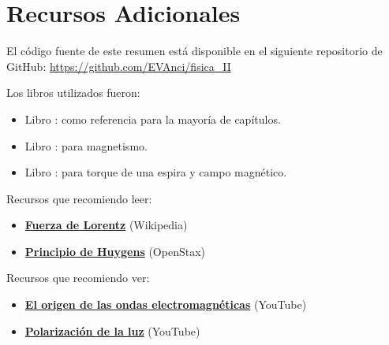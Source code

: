 \documentclass[a4paper,12pt]{article}  %
\begin{document}
  \section*{Recursos Adicionales}
  \noindent El código fuente de este resumen está disponible en el siguiente repositorio de GitHub: \url{https://github.com/EVAnci/fisica_II}
  \vspace{5pt}

  \noindent Los libros utilizados fueron:
  \begin{itemize}
    \item Libro \cite{Serway}: como referencia para la mayoría de capítulos.
    \item Libro \cite{Sears_Zemansky}: para magnetismo.
    \item Libro \cite{openstax}: para torque de una espira y campo magnético.
  \end{itemize}
  \vspace{5pt}
  
  \noindent Recursos que recomiendo leer:
  \begin{itemize}
    \item \href{https://es.wikipedia.org/wiki/Fuerza_de_Lorentz}{\textbf{Fuerza de Lorentz}} (Wikipedia)
    \item \href{https://openstax.org/books/f%C3%ADsica-universitaria-volumen-3/pages/1-6-principio-de-huygens}{\textbf{Principio de Huygens}} (OpenStax)
  \end{itemize}
  \vspace{5pt}

  \noindent Recursos que recomiendo ver:
  \begin{itemize}
    \item \href{https://www.youtube.com/watch?v=cKKM9boWqZs}{\textbf{El origen de las ondas electromagnéticas}} (YouTube)
    \item \href{https://www.youtube.com/watch?v=PMjADwpLlfs}{\textbf{Polarización de la luz}} (YouTube)
  \end{itemize}
  \newpage
  \printbibliography
\end{document}
